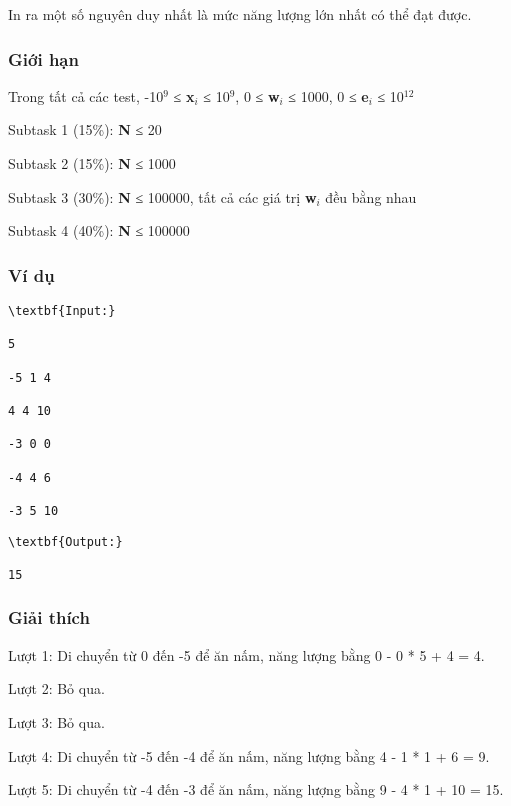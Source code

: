 In ra một số nguyên duy nhất là mức năng lượng lớn nhất có thể đạt được.

\subsubsection{Giới hạn}

Trong tất cả các test, -10$^9$ ≤ \textbf{x$_i$} ≤ 10$^9$, 0 ≤ \textbf{w$_i$} ≤ 1000, 0 ≤ \textbf{e$_i$} ≤ 10$^12$

Subtask 1 (15\%): \textbf{N} ≤ 20

Subtask 2 (15\%): \textbf{N} ≤ 1000

Subtask 3 (30\%): \textbf{N} ≤ 100000, tất cả các giá trị \textbf{w$_i$} đều bằng nhau

Subtask 4 (40\%): \textbf{N} ≤ 100000

\subsubsection{Ví dụ}
\begin{verbatim}
\textbf{Input:}

5

-5 1 4

4 4 10

-3 0 0

-4 4 6

-3 5 10

\end{verbatim}
\begin{verbatim}
\textbf{Output:}

15

\end{verbatim}

\subsubsection{Giải thích}

Lượt 1: Di chuyển từ 0 đến -5 để ăn nấm, năng lượng bằng 0 - 0 * 5 + 4 = 4.

Lượt 2: Bỏ qua.

Lượt 3: Bỏ qua.

Lượt 4: Di chuyển từ -5 đến -4 để ăn nấm, năng lượng bằng 4 - 1 * 1 + 6 = 9.

Lượt 5: Di chuyển từ -4 đến -3 để ăn nấm, năng lượng bằng 9 - 4 * 1 + 10 = 15.